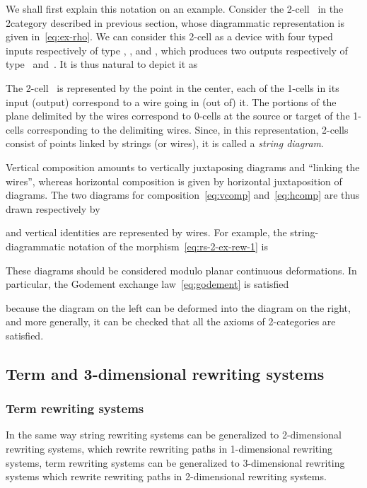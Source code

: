 \documentclass{LMCS}
\begin{document}
We shall first explain this notation on an example. Consider the 2-cell~
in the 2\nbd{}category described in previous section, whose diagrammatic
representation is given in~\eqref{eq:ex-rho}. We can consider this 2-cell as a
device with four typed inputs respectively of type , ,  and , which
produces two outputs respectively of type~ and~. It is thus natural to
depict it as

The 2-cell~ is represented by the point in the center, each of the 1-cells
in its input (\resp output) correspond to a wire going in (\resp out of) it. The
portions of the plane delimited by the wires correspond to 0-cells at the source
or target of the 1-cells corresponding to the delimiting wires. Since, in this
representation, 2-cells consist of points linked by strings (or wires), it is
called a \emph{string diagram}.



Vertical composition amounts to vertically juxtaposing diagrams and ``linking
the wires'', whereas horizontal composition is given by horizontal juxtaposition
of diagrams. The two diagrams for composition~\eqref{eq:vcomp}
and~\eqref{eq:hcomp} are thus drawn respectively by

and vertical identities are represented by wires. For example, the
string-diagrammatic notation of the morphism~\eqref{eq:rs-2-ex-rew-1} is


These diagrams should be considered modulo planar continuous deformations. In
particular, the Godement exchange law~\eqref{eq:godement} is satisfied

because the diagram on the left can be deformed into the diagram on the right,
and more generally, it can be checked that all the axioms of 2-categories are
satisfied.


\subsection{Term and 3-dimensional rewriting systems}
\subsubsection{Term rewriting systems}
\label{sec:trs}
In the same way string rewriting systems can be generalized to 2-dimensional
rewriting systems, which rewrite rewriting paths in 1-dimensional rewriting
systems, term rewriting systems can be generalized to 3-dimensional rewriting
systems which rewrite rewriting paths in 2-dimensional rewriting systems.
\end{document}
